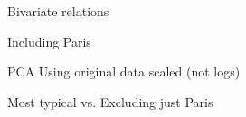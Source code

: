 \documentclass[12pt]{beamer}
\begin{document}
\begin{frame}{\textcolor{bscuro}{Bivariate relations}}
\begin{figure}[!ht] 
	\centering
\end{figure}
Including Paris
\end{frame}


\begin{frame}{\textcolor{bscuro}{PCA}}
	Using original data scaled (not logs)
	
	Most typical vs. Excluding just Paris
	\begin{figure} 
		\centering
	\end{figure}
\end{frame}
\end{document}
